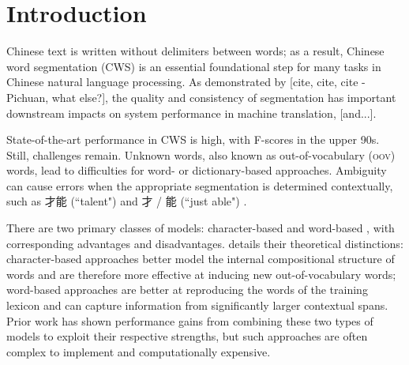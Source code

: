 \section{Introduction}

Chinese text is written without delimiters between words; as a result, Chinese word segmentation (CWS) is an essential foundational step for many tasks in Chinese natural language processing. As demonstrated by [cite, cite, cite - Pichuan, what else?], the quality and consistency of segmentation has important downstream impacts on system performance in machine translation, [and...].

State-of-the-art performance in CWS is high, with F-scores in the upper 90s. %
Still, challenges remain. Unknown words, also known as out-of-vocabulary (\textsc{oov}) words, lead to difficulties for word- or dictionary-based approaches.
Ambiguity can cause errors when the appropriate segmentation is determined contextually, such as 才能 (``talent") and 才 / 能 (``just able") \cite{Gao:2003:ACL}.

There are two primary classes of models: character-based \cite{Xue:2003:IJCLCLP,Tseng:2005:SIGHAN,Zhang:2006:HLT-NAACL,Wang:2010:COLING} and word-based \cite{Andrew:2006:EMNLP,Zhang:2007:ACL}, with corresponding advantages and disadvantages.  details their theoretical distinctions: character-based approaches better model the internal compositional structure of words and are therefore more effective at inducing new out-of-vocabulary words; word-based approaches are better at reproducing the words of the training lexicon and can capture information from significantly larger contextual spans. Prior work has shown performance gains from combining these two types of models to exploit their respective strengths, but such approaches are often complex to implement and computationally expensive.

